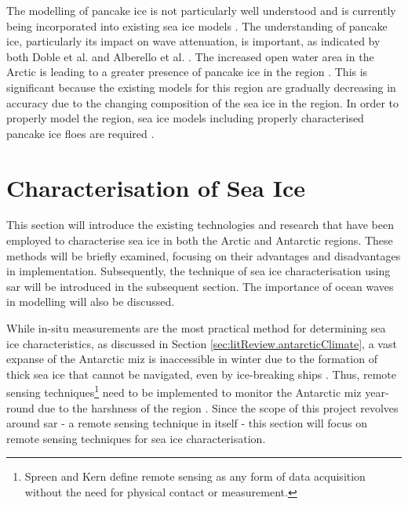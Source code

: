 The modelling of pancake ice is not particularly well understood and is currently being incorporated into existing sea ice models \cite{Alberello2019}. The understanding of pancake ice, particularly its impact on wave attenuation, is important, as indicated by both Doble et al. \cite{Doble2015} and Alberello et al. \cite{Alberello2019}. The increased open water area in the Arctic is leading to a greater presence of pancake ice in the region \cite{Alberello2019,Doble2015}. This is significant because the existing models for this region are gradually decreasing in accuracy due to the changing composition of the sea ice in the region. In order to properly model the region, sea ice models including properly characterised pancake ice floes are required \cite{Doble2015}.


\section{Characterisation of Sea Ice}
\label{sec:litReview.seaIceCharac}

This section will introduce the existing technologies and research that have been employed to characterise sea ice in both the Arctic and Antarctic regions. These methods will be briefly examined, focusing on their advantages and disadvantages in implementation. Subsequently, the technique of sea ice characterisation using \acs{sar} will be introduced in the subsequent section. The importance of ocean waves in modelling will also be discussed. %

While in-situ measurements are the most practical method for determining sea ice characteristics, as discussed in Section \ref{sec:litReview.antarcticClimate}, a vast expanse of the Antarctic \acs{miz} is inaccessible in winter due to the formation of thick sea ice that cannot be navigated, even by ice-breaking ships \cite{Maksym2012}. Thus, remote sensing techniques\footnote{Spreen and Kern \cite{Thomas2017Chap9} define remote sensing as any form of data acquisition without the need for physical contact or measurement.} need to be implemented to monitor the Antarctic \acs{miz} year-round due to the harshness of the region \cite{Kennicut2019, Maksym2012}. Since the scope of this project revolves around \acs{sar} - a remote sensing technique in itself - this section will focus on remote sensing techniques for sea ice characterisation.

